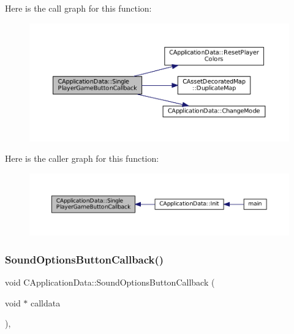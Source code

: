 Here is the call graph for this function\+:\nopagebreak
\begin{figure}[H]
\begin{center}
\leavevmode
\includegraphics[width=350pt]{classCApplicationData_a239a28599cbb6762c21306a4a03c6202_cgraph}
\end{center}
\end{figure}
Here is the caller graph for this function\+:\nopagebreak
\begin{figure}[H]
\begin{center}
\leavevmode
\includegraphics[width=350pt]{classCApplicationData_a239a28599cbb6762c21306a4a03c6202_icgraph}
\end{center}
\end{figure}
\hypertarget{classCApplicationData_a7169395ea835eaa9c98188d1b3583534}{}\label{classCApplicationData_a7169395ea835eaa9c98188d1b3583534} 
\subsubsection{\texorpdfstring{Sound\+Options\+Button\+Callback()}{SoundOptionsButtonCallback()}}
{\footnotesize\ttfamily void C\+Application\+Data\+::\+Sound\+Options\+Button\+Callback (\begin{DoxyParamCaption}\item[{void $\ast$}]{calldata }\end{DoxyParamCaption})\hspace{0.3cm}{\ttfamily [static]}, {\ttfamily [protected]}}



